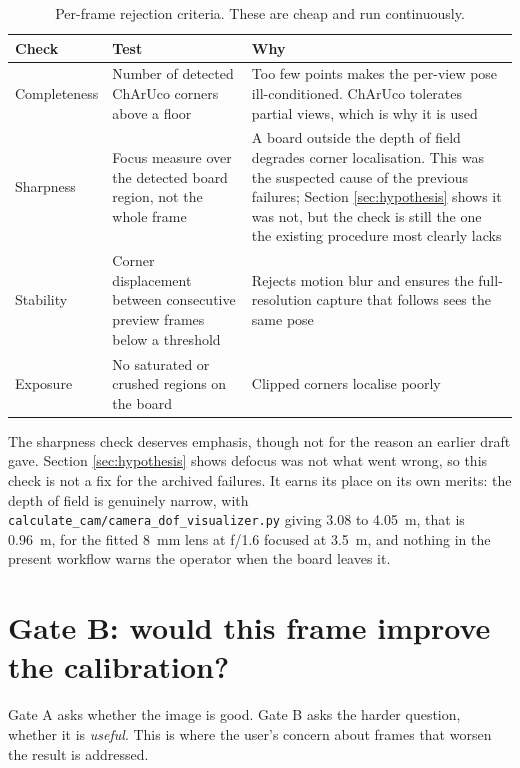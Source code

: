 \begin{table}[!ht]
\centering
\small
\caption[Gate A criteria]{Per-frame rejection criteria. These are cheap and run continuously.}
\label{tab:gatea}
\begin{tabularx}{\textwidth}{p{} p{} X}
\toprule
\textbf{Check} & \textbf{Test} & \textbf{Why} \\
\midrule
Completeness & Number of detected ChArUco corners above a floor & Too few points makes the per-view pose ill-conditioned. ChArUco tolerates partial views, which is why it is used \cite{garrido2014aruco,rojtberg2018pose} \\
Sharpness & Focus measure over the detected board region, not the whole frame & A board outside the depth of field degrades corner localisation. This was the suspected cause of the previous failures; Section \ref{sec:hypothesis} shows it was not, but the check is still the one the existing procedure most clearly lacks \\
Stability & Corner displacement between consecutive preview frames below a threshold & Rejects motion blur and ensures the full-resolution capture that follows sees the same pose \\
Exposure & No saturated or crushed regions on the board & Clipped corners localise poorly \\
\bottomrule
\end{tabularx}
\end{table}

The sharpness check deserves emphasis, though not for the reason an earlier draft gave. Section \ref{sec:hypothesis} shows defocus was not what went wrong, so this check is not a fix for the archived failures. It earns its place on its own merits: the depth of field is genuinely narrow, with \texttt{calculate\_cam/\allowbreak camera\_dof\_visualizer.py} giving 3.08 to 4.05~m, that is 0.96~m, for the fitted 8~mm lens at f/1.6 focused at 3.5~m, and nothing in the present workflow warns the operator when the board leaves it.

\section{Gate B: would this frame improve the calibration?}

Gate A asks whether the image is good. Gate B asks the harder question, whether it is \emph{useful}. This is where the user's concern about frames that worsen the result is addressed.

